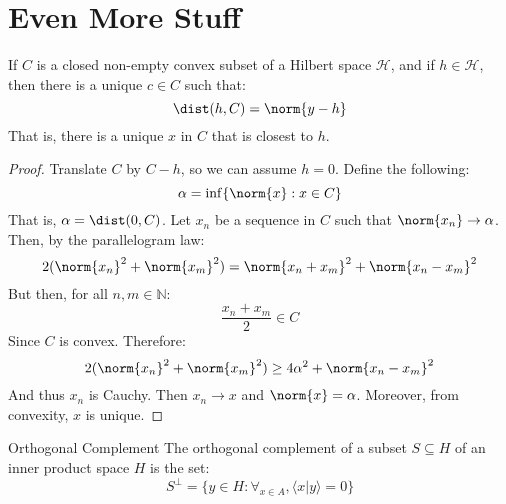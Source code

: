    \section{Even More Stuff}
        \begin{theorem}
            If $C$ is a closed non-empty convex subset of a
            Hilbert space $\mathcal{H}$, and if
            $h\in\mathcal{H}$, then there is a unique
            $c\in{C}$ such that:
            \begin{equation}
                \dist(h,C)=\norm{y-h}
            \end{equation}
            That is, there is a unique $x$ in $C$ that is
            closest to $h$.
        \end{theorem}
        \begin{proof}
            Translate $C$ by $C-h$, so we can assume $h=0$.
            Define the following:
            \begin{equation}
                \alpha=\inf\{\norm{x}:x\in{C}\}
            \end{equation}
            That is, $\alpha=\dist(0,C)$. Let $x_{n}$
            be a sequence in $C$ such that
            $\norm{x_{n}}\rightarrow\alpha$. Then, by the
            parallelogram law:
            \begin{equation}
                2(\norm{x_{n}}^{2}+\norm{x_{m}}^{2})=
                \norm{x_{n}+x_{m}}^{2}+
                \norm{x_{n}-x_{m}}^{2}
            \end{equation}
            But then, for all $n,m\in\mathbb{N}$:
            \begin{equation}
                \frac{x_{n}+x_{m}}{2}\in{C}
            \end{equation}
            Since $C$ is convex. Therefore:
            \begin{equation}
                2(\norm{x_{n}}^{2}+\norm{x_{m}}^{2})
                \geq4\alpha^{2}+\norm{x_{n}-x_{m}}^{2}
            \end{equation}
            And thus $x_{n}$ is Cauchy. Then
            $x_{n}\rightarrow{x}$ and $\norm{x}=\alpha$.
            Moreover, from convexity, $x$ is unique.
        \end{proof}
        \begin{ldefinition}{Orthogonal Complement}
            The orthogonal complement of a subset
            $S\subseteq{H}$ of an inner product space
            $H$ is the set:
            \begin{equation}
                S^{\perp}=\{y\in{H}:\forall_{x\in{A}},
                    \langle{x|y}\rangle=0\}
            \end{equation}
        \end{ldefinition}
